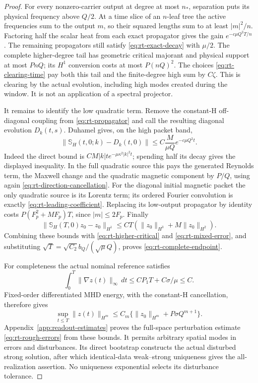 \documentclass[11pt,a4paper]{amsart}
\theoremstyle{definition}
\theoremstyle{remark}
\numberwithin{equation}{section}
\newcommand{\norm}[1]{\lVert #1\rVert}
\begin{document}
\begin{proof}
For every nonzero-carrier output at degree at most $n_*$, separation
puts its physical frequency above $Q/2$.  At a time slice of an $n$-leaf
tree the active frequencies sum to the output $m$, so their squared
lengths sum to at least $|m|^2/n$.  Factoring half the scalar heat from
each exact propagator gives the gain
$e^{-c\mu Q^2T/n}$.  The remaining propagators still satisfy
\eqref{eq:rt-exact-decay} with $\mu/2$.  The complete higher-degree tail
has geometric critical majorant and physical support at most $PnQ$;
its $H^1$ conversion costs at most $P(nQ)^2$.  The choices
\eqref{eq:rt-clearing-time} pay both this tail and the finite-degree high
sum by $C\zeta$.  This is clearing by the actual evolution, including
high modes created during the window.  It is not an application of a
spectral projector.

It remains to identify the low quadratic term.  Remove the constant-H
off-diagonal coupling from \eqref{eq:rt-propagator} and call the resulting
diagonal evolution $D_k(t,s)$.  Duhamel gives, on the high packet band,
\begin{equation}\label{eq:rt-alfven-comparison}
 \norm{\mathbb S_H(t,0;k)-D_k(t,0)}
 \le C\frac M{\mu Q}e^{-c\mu Q^2t}.
\end{equation}
Indeed the direct bound is $C M|k|t e^{-\mu\kappa^2|k|^2t}$;
spending half its decay gives the displayed inequality.  In the full
quadratic source this pays the generated Reynolds term, the Maxwell
change and the quadratic magnetic component by $P/Q$, using again
\eqref{eq:rt-direction-cancellation}.  For the diagonal initial
magnetic packet the only quadratic source is its Lorentz term; its
ordered Fourier convolution is exactly
\eqref{eq:rt-leading-coefficient}.  Replacing its low-output propagator
by identity costs $P(F_p^2+MF_p)T$, since $|m|\le2F_p$.  Finally
\[
 \norm{\mathbb S_H(T,0)z_0-z_0}_{H^1}
 \le CT(\norm{z_0}_{H^3}+M\norm{z_0}_{H^2}).
\]
Combining these bounds with \eqref{eq:rt-higher-critical} and
\eqref{eq:rt-mixed-error}, and substituting
$\sqrt T=\sqrt{C_2}b_Q/(\sqrt\mu Q)$, proves
\eqref{eq:rt-complete-endpoint}.

For completeness the actual nominal reference satisfies
\begin{equation}\label{eq:rt-integrated-gradient}
 \int_0^T\norm{\nabla z(t)}_\infty\,dt
       \le CP_1T+C\sigma/\mu\le C.
\end{equation}
Fixed-order differentiated MHD energy, with the constant-H cancellation,
therefore gives
\[
 \sup_{t\le T}\norm{z(t)}_{H^m}
 \le C_m\{\norm{z_0}_{H^m}+P\sigma Q^{m+1}\}.
\]
Appendix~\ref{app:readout-estimates} proves the full-space perturbation
estimate \eqref{eq:rt-rough-errors} from these bounds.  It permits arbitrary
spatial modes in errors and disturbances.  Its direct bootstrap constructs
the actual disturbed strong solution, after which identical-data
weak--strong uniqueness gives the all-realization assertion.  No
uniqueness exponential selects its disturbance tolerance.
\end{proof}
\end{document}
